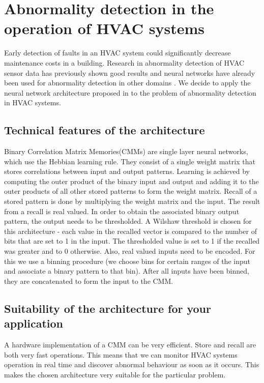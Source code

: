 \documentclass[a4paper, 11pt]{article}
\begin{document}
\section{Abnormality detection in the operation of HVAC systems}
Early detection of faults in an HVAC system could significantly decrease maintenance costs in a building. Research in abnormality detection of HVAC sensor data has previously shown good results \cite{Narayanaswamy2014} and neural networks have already been used for abnormality detection in other domains \cite{wrro89505}. We decide to apply the neural network architecture proposed in \cite{wrro89505} to the problem of abnormality detection in HVAC systems.
\subsection{Technical features of the architecture}

Binary Correlation Matrix Memories(CMMs) are single layer neural networks, which use the Hebbian learning rule. They consist of a single weight matrix that stores correlations between input and output patterns. Learning is achieved by computing the outer product of the binary input and output and adding it to the outer products of all other stored patterns to form the weight matrix. Recall of a stored pattern is done by multiplying the weight matrix and the input. The result from a recall is real valued. In order to obtain the associated binary output pattern, the output needs to be thresholded. A Wilshaw threshold is chosen for this architecture - each value in the recalled vector is compared to the number of bits that are set to 1 in the input. The thresholded value is set to 1 if the recalled was greater and to 0 otherwise. Also, real valued inputs need to be encoded. For this we use a binning procedure (we choose bins for certain ranges of the input and associate a binary pattern to that bin). After all inputs have been binned, they are concatenated to form the input to the CMM. 
\subsection{Suitability of the architecture for your application}
A hardware implementation of a CMM can be very efficient. Store and recall are both very fast operations. This means that we can monitor HVAC systems operation in real time and discover abnormal behaviour as soon as it occurs. This makes the chosen architecture very suitable for the particular problem.
\end{document}
